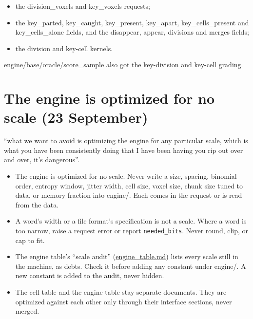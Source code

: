 \begin{itemize}
\item the division\_\allowbreak{}voxels and key\_\allowbreak{}voxels requests;
\item the key\_\allowbreak{}parted, key\_\allowbreak{}caught, key\_\allowbreak{}present, key\_\allowbreak{}apart, key\_\allowbreak{}cells\_\allowbreak{}present and key\_\allowbreak{}cells\_\allowbreak{}alone fields, and the disappear, appear, divisions and merges fields;
\item the division and key-cell kernels.
\end{itemize}

engine/base/oracle/score\_\allowbreak{}sample also got the key-division and key-cell grading.

\section{\texorpdfstring{The engine is optimized for no scale (23 September)}{The engine is optimized for no scale (23 September)}}

“what we want to avoid is optimizing the engine for any particular scale, which is what you have been consistently doing that I have been having you rip out over and over, it's dangerous”.

\begin{itemize}
\item The engine is optimized for no scale. Never write a size, spacing, binomial order, entropy window, jitter width, cell size, voxel size, chunk size tuned to data, or memory fraction into engine/. Each comes in the request or is read from the data.
\item A word's width or a file format's specification is not a scale. Where a word is too narrow, raise a request error or report \texttt{needed\_\allowbreak{}bits}. Never round, clip, or cap to fit.
\item The engine table's “scale audit” (\hyperref[chap:engine-table]{engine\_\allowbreak{}table.md}) lists every scale still in the machine, as debts. Check it before adding any constant under engine/. A new constant is added to the audit, never hidden.
\item The cell table and the engine table stay separate documents. They are optimized against each other only through their interface sections, never merged.
\end{itemize}
